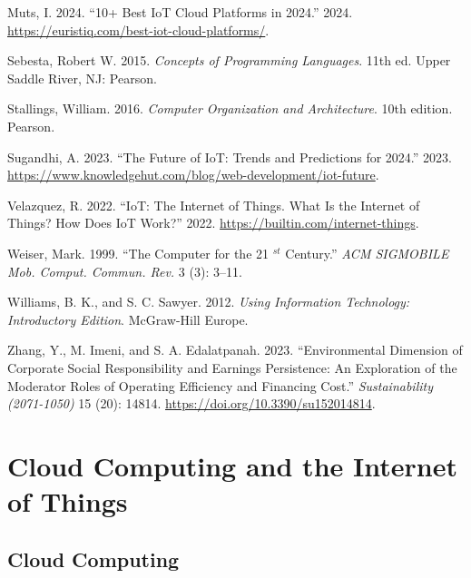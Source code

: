\documentclass[
  letterpaper,
  DIV=11,
  numbers=noendperiod]{scrreprt}
\newlength{\cslhangindent}
\newenvironment{CSLReferences}[2] %
 {\begin{list}{}{%
  \setlength{\itemindent}{0pt}
  \setlength{\leftmargin}{0pt}
  \setlength{\parsep}{0pt}
  \ifodd #1
   \setlength{\leftmargin}{\cslhangindent}
   \setlength{\itemindent}{-1\cslhangindent}
  \fi
  \setlength{\itemsep}{#2\baselineskip}}}
 {\end{list}}
\begin{document}
\begin{CSLReferences}{1}{0}
Muts, I. 2024. {``10+ Best IoT Cloud Platforms in 2024.''} 2024.
\url{https://euristiq.com/best-iot-cloud-platforms/}.

Sebesta, Robert W. 2015. \emph{Concepts of Programming Languages}. 11th
ed. Upper Saddle River, NJ: Pearson.

Stallings, William. 2016. \emph{Computer Organization and Architecture}.
10th edition. Pearson.

Sugandhi, A. 2023. {``The Future of IoT: Trends and Predictions for
2024.''} 2023.
\url{https://www.knowledgehut.com/blog/web-development/iot-future}.

Velazquez, R. 2022. {``IoT: The Internet of Things. What Is the Internet
of Things? How Does IoT Work?''} 2022.
\url{https://builtin.com/internet-things}.

Weiser, Mark. 1999. {``The Computer for the 21 \(^{st}\) Century.''}
\emph{ACM SIGMOBILE Mob. Comput. Commun. Rev.} 3 (3): 3--11.

Williams, B. K., and S. C. Sawyer. 2012. \emph{Using Information
Technology: Introductory Edition}. McGraw-Hill Europe.

Zhang, Y., M. Imeni, and S. A. Edalatpanah. 2023. {``Environmental
Dimension of Corporate Social Responsibility and Earnings Persistence:
An Exploration of the Moderator Roles of Operating Efficiency and
Financing Cost.''} \emph{Sustainability (2071-1050)} 15 (20): 14814.
\url{https://doi.org/10.3390/su152014814}.

\end{CSLReferences}


\chapter{Cloud Computing and the Internet of
Things}\label{cloud-computing-and-the-internet-of-things}

\section{Cloud Computing}\label{cloud-computing}
\end{document}

